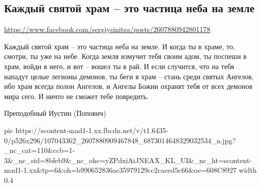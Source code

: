  
 
 
 
 

\subsection{Каждый святой храм – это частица неба на земле}
\url{https://www.facebook.com/sergiysinitsa/posts/2607880942801178}

Каждый святой храм – это частица неба на земле. И когда ты в храме, то, смотри,
ты уже на небе. Когда земля измучит тебя своим адом, ты поспеши в храм, войди в
него, и вот – вошел ты в рай. И если случится, что на тебя нападут целые
легионы демонов, ты беги в храм – стань среди святых Ангелов, ибо храм всегда
полон Ангелов, и Ангелы Божии охранят тебя от всех демонов мира сего. И ничто
не сможет тебе повредить. 

Преподобный Иустин (Попович)

\ifcmt
  pic https://scontent-mad1-1.xx.fbcdn.net/v/t1.6435-0/p526x296/107043362_2607880909467848_6873014648329032534_n.jpg?_nc_cat=110&ccb=1-3&_nc_sid=8bfeb9&_nc_ohc=yZPdxiAiJNEAX_KL_UI&_nc_ht=scontent-mad1-1.xx&tp=6&oh=b990652836ac35979129cc2caced5c66&oe=608C8927
  width 0.4
\fi


